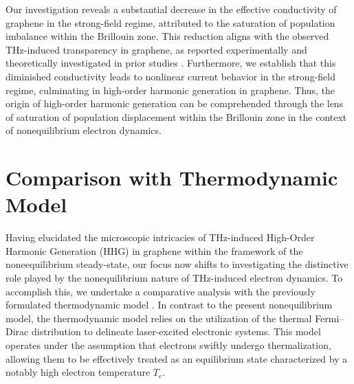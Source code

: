 Our investigation reveals a substantial decrease in the effective conductivity of graphene in the strong-field regime, attributed to the saturation of population imbalance within the Brillouin zone. This reduction aligns with the observed THz-induced transparency in graphene, as reported experimentally \cite{Hwang2013, Paul_2013, doi:10.1063/1.4902999} and theoretically investigated in prior studies \cite{sato2021nonlinear}. Furthermore, we establish that this diminished conductivity leads to nonlinear current behavior in the strong-field regime, culminating in high-order harmonic generation in graphene. Thus, the origin of high-order harmonic generation can be comprehended through the lens of saturation of population displacement within the Brillouin zone in the context of nonequilibrium electron dynamics.
\section{Comparison with Thermodynamic Model \label{sec:thermo}}
Having elucidated the microscopic intricacies of THz-induced High-Order Harmonic Generation (HHG) in graphene within the framework of the noneequilibrium steady-state, our focus now shifts to investigating the distinctive role played by the nonequilibrium nature of THz-induced electron dynamics. To accomplish this, we undertake a comparative analysis with the previously formulated thermodynamic model \cite{mics2015thermodynamic}. In contrast to the present nonequilibrium model, the thermodynamic model relies on the utilization of the thermal Fermi--Dirac distribution to delineate laser-excited electronic systems. This model operates under the assumption that electrons swiftly undergo thermalization, allowing them to be effectively treated as an equilibrium state characterized by a notably high electron temperature $T_e$.

